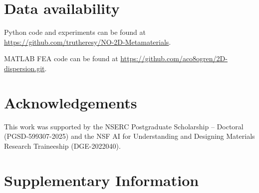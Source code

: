 \documentclass[preprint,review,12pt,numafflabel]{elsarticle}
\begin{document}
\section*{Data availability}
\label{sec:Repository}
Python code and experiments can be found at
\url{https://github.com/trutheresy/NO-2D-Metamaterials}.

MATLAB FEA code can be found at
\url{https://github.com/aco8ogren/2D-dispersion.git}.

\section*{Acknowledgements}
This work was supported by the NSERC Postgraduate Scholarship -- Doctoral (PGSD-599307-2025) and the NSF AI for Understanding and Designing Materials Research Traineeship (DGE-2022040).


% 


\clearpage
\appendix

\renewcommand{\thesection}{S\arabic{section}}
\renewcommand{\thesubsection}{S\arabic{section}.\arabic{subsection}}
\renewcommand{\thefigure}{S\arabic{figure}}
\renewcommand{\thetable}{S\arabic{table}}
\renewcommand{\theequation}{S\arabic{equation}}

\setcounter{figure}{0}
\setcounter{table}{0}
\setcounter{equation}{0}

\section{Supplementary Information}
\label{sec:supplement}
\end{document}
